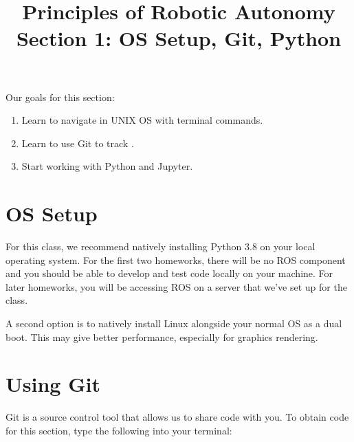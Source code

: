 \documentclass{article}
\title{Principles of Robotic Autonomy \\ Section 1: OS Setup, Git, Python}
\date{}
\begin{document}
\maketitle
\pagestyle{fancy}

Our goals for this section: \begin{enumerate}
    \item Learn to navigate in UNIX OS with terminal commands.
    \item Learn to use Git to track .
    \item Start working with Python and Jupyter.
\end{enumerate}

\section{OS Setup}
For this class, we recommend natively installing Python 3.8 on your local operating system. For the first two homeworks, there will be no ROS component and you should be able to develop and test code locally on your machine. For later homeworks, you will be accessing ROS on a server that we've set up for the class.


A second option is to natively install Linux alongside your normal OS as a dual boot. This may give better performance, especially for graphics rendering. %



\section{Using Git}
Git is a source control tool that allows us to share code with you. To obtain code for this section, type the following into your terminal:
\end{document}
